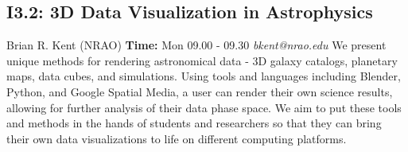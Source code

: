 \documentclass{report}
\begin{document}
\subsection*{I3.2: 3D Data Visualization in Astrophysics}
\bigskip
Brian R. Kent (NRAO) \newline   \newline   \newline   \newline  \newline  \newline\newline
{\bf Time:} Mon 09.00 - 09.30\newline
\newline
{\it bkent@nrao.edu}\newline
\newline\newline
We present unique methods for rendering astronomical data - 3D galaxy catalogs, planetary maps, data cubes, and simulations.  Using tools and languages including Blender, Python, and Google Spatial Media, a user can render their own science results, allowing for further analysis of their data phase space.  We aim to put these tools and methods in the hands of students and researchers so that they can bring their own data visualizations to life on different computing platforms.\newline
\newpage
\end{document}
